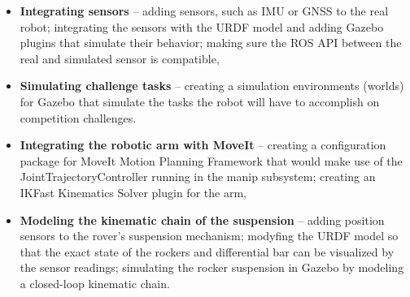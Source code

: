 \documentclass[english,inz,shortabstract]{iithesis}
\begin{document}
\begin{itemize}
	\item \textbf{Integrating sensors} -- adding sensors, such as IMU or GNSS to the real robot; integrating the sensors with the URDF model and adding Gazebo plugins that simulate their behavior; making sure the ROS API between the real and simulated sensor is compatible,
	\item \textbf{Simulating challenge tasks} -- creating a simulation environments (worlds) for Gazebo that simulate the tasks the robot will have to accomplish on competition challenges.
	\item \textbf{Integrating the robotic arm with MoveIt} -- creating a configuration package for MoveIt Motion Planning Framework that would make use of the \textsf{\mbox{JointTrajectoryController}} running in the \textsf{manip} subsystem; creating an IKFast Kinematics Solver plugin for the arm,
	\item \textbf{Modeling the kinematic chain of the suspension} -- adding position sensors to the rover's suspension mechanism; modyfing the URDF model so that the exact state of the rockers and differential bar can be visualized by the sensor readings; simulating the rocker suspension in Gazebo by modeling a closed-loop kinematic chain.
\end{itemize}



\end{document}
